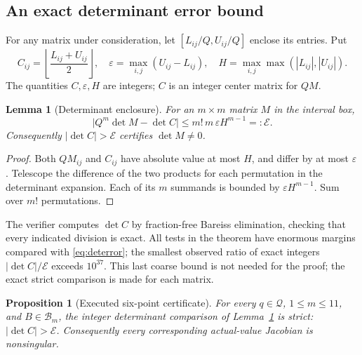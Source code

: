 \documentclass[11pt,a4paper]{article}
\newtheorem{lemma}[theorem]{Lemma}
\newtheorem{proposition}[theorem]{Proposition}
\theoremstyle{definition}\newtheorem{definition}[theorem]{Definition}
\theoremstyle{remark}\newtheorem{remark}[theorem]{Remark}
\begin{document}
\subsection{An exact determinant error bound}
For any matrix under consideration, let $[L_{ij}/Q,U_{ij}/Q]$ enclose its entries. Put
\[
C_{ij}=\left\lfloor\frac{L_{ij}+U_{ij}}2\right\rfloor,\quad
\varepsilon=\max_{i,j}(U_{ij}-L_{ij}),\quad
H=\max_{i,j}\max(|L_{ij}|,|U_{ij}|).
\]
The quantities $C,\varepsilon,H$ are integers; $C$ is an integer center matrix for $QM$.
\begin{lemma}[Determinant enclosure]\label{lem:detbound}
For an $m\times m$ matrix $M$ in the interval box,
\begin{equation}\label{eq:deterror}
\bigl|Q^m\det M-\det C\bigr|
\le m!\,m\,\varepsilon H^{m-1}=:\mathcal E.
\end{equation}
Consequently $|\det C|>\mathcal E$ certifies $\det M\ne0$.
\end{lemma}
\begin{proof}
Both $QM_{ij}$ and $C_{ij}$ have absolute value at most $H$, and differ by at most $\varepsilon$. Telescope the difference of the two products for each permutation in the determinant expansion. Each of its $m$ summands is bounded by $\varepsilon H^{m-1}$. Sum over $m!$ permutations.
\end{proof}

The verifier computes $\det C$ by fraction-free Bareiss elimination, checking that every indicated division is exact. All tests in the theorem have enormous margins compared with \eqref{eq:deterror}; the smallest observed ratio of exact integers $|\det C|/\mathcal E$ exceeds $10^{37}$. This last coarse bound is not needed for the proof; the exact strict comparison is made for each matrix.


\begin{proposition}[Executed six-point certificate]\label{prop:computed}
For every $q\in\mathcal Q$, $1\le m\le11$, and $B\in\mathcal B_m$, the integer determinant comparison of Lemma~\ref{lem:detbound} is strict: $|\det C|>\mathcal E$. Consequently every corresponding actual-value Jacobian is nonsingular.
\end{proposition}
\end{document}
